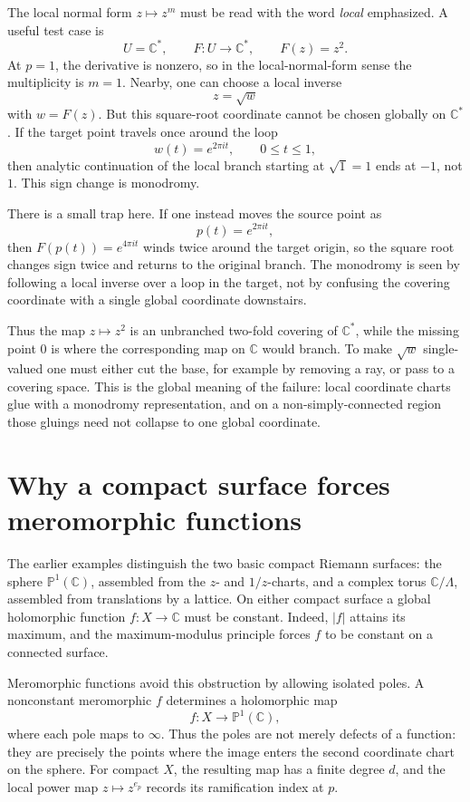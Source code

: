 The local normal form \(z\mapsto z^m\) must be read with the word \emph{local} emphasized.  A useful test case is
\[
  U=\mathbb C^*,
  \qquad
  F:U\to\mathbb C^*,
  \qquad
  F(z)=z^2.
\]
At \(p=1\), the derivative is nonzero, so in the local-normal-form sense the multiplicity is \(m=1\).  Nearby, one can choose a local inverse
\[
  z=\sqrt{w}
\]
with \(w=F(z)\).  But this square-root coordinate cannot be chosen globally on \(\mathbb C^*\).  If the target point travels once around the loop
\[
  w(t)=e^{2\pi it},
  \qquad 0\le t\le1,
\]
then analytic continuation of the local branch starting at \(\sqrt1=1\) ends at \(-1\), not \(1\).  This sign change is monodromy.

There is a small trap here.  If one instead moves the source point as
\[
  p(t)=e^{2\pi it},
\]
then \(F(p(t))=e^{4\pi it}\) winds twice around the target origin, so the square root changes sign twice and returns to the original branch.  The monodromy is seen by following a local inverse over a loop in the target, not by confusing the covering coordinate with a single global coordinate downstairs.

Thus the map \(z\mapsto z^2\) is an unbranched two-fold covering of \(\mathbb C^*\), while the missing point \(0\) is where the corresponding map on \(\mathbb C\) would branch.  To make \(\sqrt w\) single-valued one must either cut the base, for example by removing a ray, or pass to a covering space.  This is the global meaning of the failure: local coordinate charts glue with a monodromy representation, and on a non-simply-connected region those gluings need not collapse to one global coordinate.

\section{Why a compact surface forces meromorphic functions}

The earlier examples distinguish the two basic compact Riemann surfaces: the sphere \(\mathbb P^1(\mathbb C)\), assembled from the \(z\)- and \(1/z\)-charts, and a complex torus \(\mathbb C/\Lambda\), assembled from translations by a lattice. On either compact surface a global holomorphic function \(f:X\to\mathbb C\) must be constant. Indeed, \(|f|\) attains its maximum, and the maximum-modulus principle forces \(f\) to be constant on a connected surface.

Meromorphic functions avoid this obstruction by allowing isolated poles. A nonconstant meromorphic \(f\) determines a holomorphic map
\[
 f:X\longrightarrow\mathbb P^1(\mathbb C),
\]
where each pole maps to \(\infty\). Thus the poles are not merely defects of a function: they are precisely the points where the image enters the second coordinate chart on the sphere. For compact \(X\), the resulting map has a finite degree \(d\), and the local power map \(z\mapsto z^{e_p}\) records its ramification index at \(p\).

